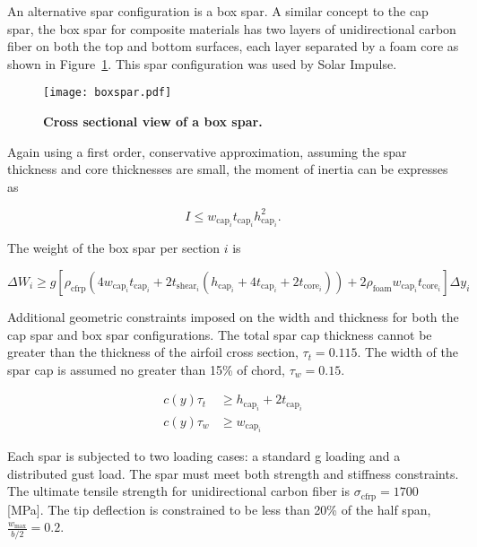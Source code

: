 \documentclass[]{aiaa-tc}%
\begin{document}
An alternative spar configuration is a box spar.  
A similar concept to the cap spar, the box spar for composite materials has two layers of unidirectional carbon fiber on both the top and bottom surfaces, each layer separated by a foam core as shown in Figure~\ref{f:boxspar}.
This spar configuration was used by Solar Impulse.\cite{zephyr_spar}

\begin{figure}[h!]
	\begin{center}
	\texttt{[image: boxspar.pdf]}
    \caption{\textbf{Cross sectional view of a box spar.}}
	\label{f:boxspar}
	\end{center}
\end{figure}

Again using a first order, conservative approximation, assuming the spar thickness and core thicknesses are small, the moment of inertia can be expresses as

\begin{equation}
    \label{e:moispar}
    I \leq w_{\text{cap}_i}t_{\text{cap}_i}h_{\text{cap}_i}^2.
\end{equation}

The weight of the box spar per section $i$ is 

\begin{equation}
    \label{e:sparmass}
    \Delta W_i \geq g [\rho_{\text{cfrp}} (4w_{\text{cap}_i}t_{\text{cap}_i} + 2t_{\mathrm{shear}_i}(h_{\mathrm{cap}_i} + 4t_{\mathrm{cap}_i} + 2t_{\mathrm{core}_i})) + 2\rho_{\mathrm{foam}} w_{\mathrm{cap}_i}t_{\mathrm{core}_i}] \Delta y_i
\end{equation}

Additional geometric constraints imposed on the width and thickness for both the cap spar and box spar configurations.  
The total spar cap thickness cannot be greater than the thickness of the airfoil cross section, $\tau_t = 0.115$.  
The width of the spar cap is assumed no greater than 15\% of chord, $\tau_w = 0.15$. 

\begin{align}
    c(y)\tau_t &\geq h_{\text{cap}_i} + 2t_{\text{cap}_i} \\
    c(y)\tau_w &\geq w_{\text{cap}_i} 
\end{align}

Each spar is subjected to two loading cases: a standard g loading and a distributed gust load.  The spar must meet both strength and stiffness constraints.
The ultimate tensile strength for unidirectional carbon fiber is $\sigma_{\text{cfrp}} = 1700$ [MPa].\cite{cfprop}
The tip deflection is constrained to be less than 20\% of the half span, $\frac{w_{\text{max}}}{b/2} = 0.2$.
\end{document}
